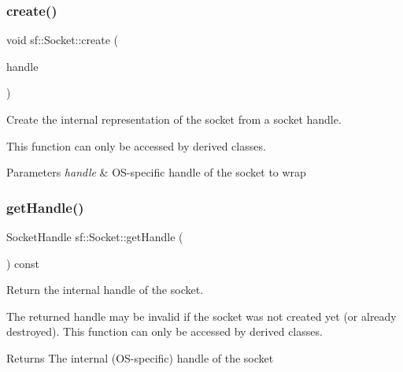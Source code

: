 \subsubsection{\texorpdfstring{create()}{create()}\hspace{0.1cm}{\footnotesize\ttfamily [2/2]}}
{\footnotesize\ttfamily void sf\+::\+Socket\+::create (\begin{DoxyParamCaption}\item[{Socket\+Handle}]{handle }\end{DoxyParamCaption})\hspace{0.3cm}{\ttfamily [protected]}}



Create the internal representation of the socket from a socket handle. 

This function can only be accessed by derived classes.


\begin{DoxyParams}{Parameters}
{\em handle} & O\+S-\/specific handle of the socket to wrap \\
\hline
\end{DoxyParams}
\mbox{\label{classsf_1_1_socket_a675457784284ae2f5640bbbe16729393}} 
\subsubsection{\texorpdfstring{get\+Handle()}{getHandle()}}
{\footnotesize\ttfamily Socket\+Handle sf\+::\+Socket\+::get\+Handle (\begin{DoxyParamCaption}{ }\end{DoxyParamCaption}) const\hspace{0.3cm}{\ttfamily [protected]}}



Return the internal handle of the socket. 

The returned handle may be invalid if the socket was not created yet (or already destroyed). This function can only be accessed by derived classes.

\begin{DoxyReturn}{Returns}
The internal (O\+S-\/specific) handle of the socket 
\end{DoxyReturn}
\mbox{\label{classsf_1_1_socket_ab1ceca9ac114b8baeeda3b34a0aca468}} 
